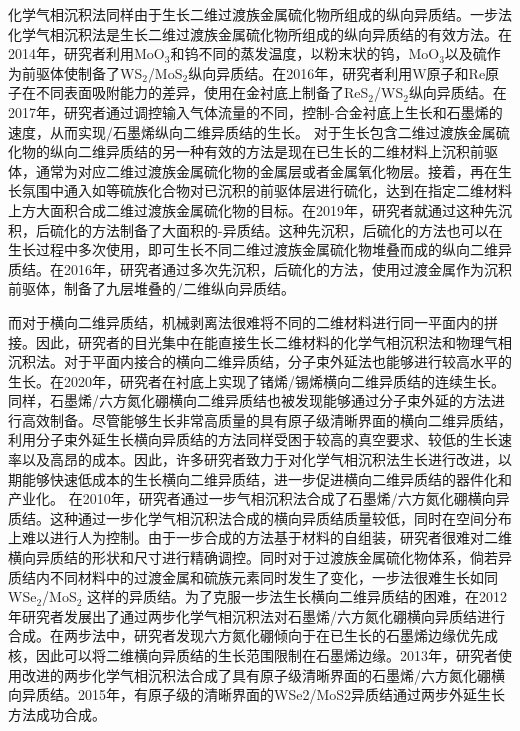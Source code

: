     化学气相沉积法同样由于生长二维过渡族金属硫化物所组成的纵向异质结。一步法化学气相沉积法是生长二维过渡族金属硫化物所组成的纵向异质结的有效方法。在2014年，研究者利用MoO$_3$和钨不同的蒸发温度，以粉末状的钨，MoO$_3$以及硫作为前驱体使制备了WS$_2$/MoS$_2$纵向异质结。在2016年，研究者利用W原子和Re原子在不同表面吸附能力的差异，使用在金衬底上制备了ReS$_2$/WS$_2$纵向异质结。在2017年，研究者通过调控输入气体流量的不同，控制-合金衬底上生长和石墨烯的速度，从而实现/石墨烯纵向二维异质结的生长。
    对于生长包含二维过渡族金属硫化物的纵向二维异质结的另一种有效的方法是现在已生长的二维材料上沉积前驱体，通常为对应二维过渡族金属硫化物的金属层或者金属氧化物层。接着，再在生长氛围中通入如等硫族化合物对已沉积的前驱体层进行硫化，达到在指定二维材料上方大面积合成二维过渡族金属硫化物的目标。在2019年，研究者就通过这种先沉积，后硫化的方法制备了大面积的-异质结。这种先沉积，后硫化的方法也可以在生长过程中多次使用，即可生长不同二维过渡族金属硫化物堆叠而成的纵向二维异质结。在2016年，研究者通过多次先沉积，后硫化的方法，使用过渡金属作为沉积前驱体，制备了九层堆叠的/二维纵向异质结。

    而对于横向二维异质结，机械剥离法很难将不同的二维材料进行同一平面内的拼接。因此，研究者的目光集中在能直接生长二维材料的化学气相沉积法和物理气相沉积法。对于平面内接合的横向二维异质结，分子束外延法也能够进行较高水平的生长。在2020年，研究者在衬底上实现了锗烯/锡烯横向二维异质结的连续生长。同样，石墨烯/六方氮化硼横向二维异质结也被发现能够通过分子束外延的方法进行高效制备。尽管能够生长非常高质量的具有原子级清晰界面的横向二维异质结，利用分子束外延生长横向异质结的方法同样受困于较高的真空要求、较低的生长速率以及高昂的成本。因此，许多研究者致力于对化学气相沉积法生长进行改进，以期能够快速低成本的生长横向二维异质结，进一步促进横向二维异质结的器件化和产业化。
    在2010年，研究者通过一步气相沉积法合成了石墨烯/六方氮化硼横向异质结。这种通过一步化学气相沉积法合成的横向异质结质量较低，同时在空间分布上难以进行人为控制。由于一步合成的方法基于材料的自组装，研究者很难对二维横向异质结的形状和尺寸进行精确调控。同时对于过渡族金属硫化物体系，倘若异质结内不同材料中的过渡金属和硫族元素同时发生了变化，一步法很难生长如同WSe$_2$/MoS$_2$ 这样的异质结。为了克服一步法生长横向二维异质结的困难，在2012年研究者发展出了通过两步化学气相沉积法对石墨烯/六方氮化硼横向异质结进行合成。在两步法中，研究者发现六方氮化硼倾向于在已生长的石墨烯边缘优先成核，因此可以将二维横向异质结的生长范围限制在石墨烯边缘。2013年，研究者使用改进的两步化学气相沉积法合成了具有原子级清晰界面的石墨烯/六方氮化硼横向异质结。2015年，有原子级的清晰界面的WSe2/MoS2异质结通过两步外延生长方法成功合成。

